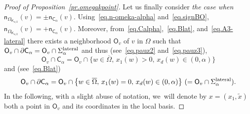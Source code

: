 \documentclass[10pt]{amsart}
\let\pa\partial
\theoremstyle{plain}
\theoremstyle{definition}
\begin{document}
\begin{proof}[Proof of Proposition~\ref{pr.omegakpoint}]
Let us finally consider \emph{the case when $\mathsf n_{\Omega_{\mathsf K_{\alpha/2}}}(v)=\pm \mathsf n_{\mathsf C_\alpha}(v)$}. Using~\eqref{eq.n-omeka-alpha} and~\eqref{eq.signBO},
$\mathsf n_{\Omega_{\mathsf K_{\alpha/2}}}(v)= +\mathsf n_{\mathsf C_\alpha}(v)$. Moreover, from~\eqref{eq.Calpha},~\eqref{eq.Blat}, and~\eqref{eq.A3-lateral} there exists a neighborhood $\mathsf O_v$ of $v$ in $\Omega$ such that $ \mathsf O_v\cap \pa \mathsf C_\alpha= \mathsf O_v\cap \Sigma_\alpha^{\textup{lateral}}$ and thus (see~\eqref{eq.pauz2} and~\eqref{eq.pauz3}),
\[
\mathsf O_v\cap \mathsf C_\alpha=\mathsf O_v\cap\big \{w\in \overline \Omega, \, x_1(w)>0, \, x_d(w)\in (0,\alpha)\big \}
\]
and (see~\eqref{eq.Blat})
\begin{equation}\label{eq.normalCalpha}
\mathsf O_v\cap \pa \mathsf C_\alpha=\mathsf O_v\cap\big \{w\in \overline \Omega, \, x_1(w)=0, \, x_d(w)\in (0,\alpha)\big \}\ (=\mathsf O_v\cap \Sigma_\alpha^{\textup{lateral}}).
\end{equation}
In the following, with a slight abuse of notation, we~will denote by $x=(x_1,\tilde x)$ both a point in $\mathsf O_v$ and its coordinates in the local basis.


\end{proof}
\end{document}
